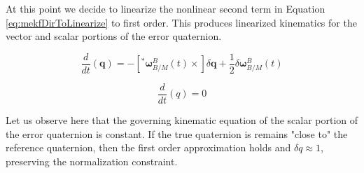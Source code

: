 \documentclass[conf]{new-aiaa}
\newcommand{\vect}[1]{\mathbf{#1}}
\newcommand{\errwBM}{\delta\vect{\omega}^B_{B/M}}
\newcommand{\wBM}{\vect{\omega}^B_{B/M}}
\begin{document}



At this point we decide to linearize the nonlinear second term in Equation \ref{eq:mekfDirToLinearize} to first order. This produces linearized kinematics for the vector and scalar portions of the error quaternion.

\begin{equation}
 \frac{d}{dt}({\vect{q}}) =
 -
 [^*\wBM(t) \times]\delta\vect{q} + \frac{1}{2}\errwBM(t)
\label{eq:mekfVecKin}
\end{equation}

\begin{equation}
 \frac{d}{dt}({q}) = 0
\label{eq:mekfScalarKin}
\end{equation}


Let us observe here that the governing kinematic equation of the scalar portion of the error quaternion is constant. If the true quaternion is remains "close to" the reference quaternion, then the first order approximation holds and $\delta q \approx 1$, preserving the normalization constraint.
\end{document}
